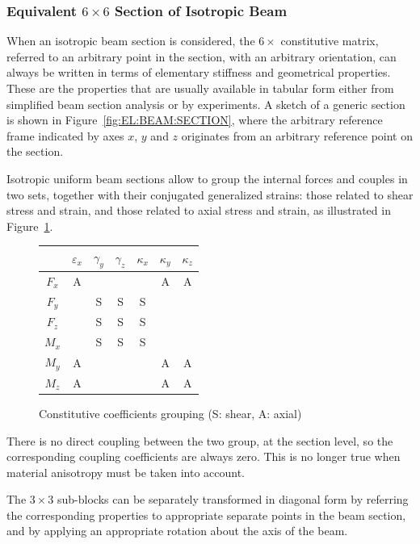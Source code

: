 \subsubsection{Equivalent $6\times6$ Section of Isotropic Beam}
When an isotropic beam section is considered, the $6\times$ 
constitutive matrix, referred to an arbitrary point in the section,
with an arbitrary orientation, can always be written in terms 
of elementary stiffness and geometrical properties.
These are the properties that are usually available in tabular form
either from simplified beam section analysis or by experiments.
A sketch of a generic section is shown
in Figure~\ref{fig:EL:BEAM:SECTION},
where the arbitrary reference frame indicated by axes 
$x$, $y$ and $z$ originates from an arbitrary reference point
on the section.

Isotropic uniform beam sections allow to group the internal forces 
and couples in two sets, together with their conjugated generalized 
strains:
those related to shear stress and strain, and those related 
to axial stress and strain, as illustrated
in Figure~\ref{fig:EL:BEAM:GROUPS}.
\begin{figure}[h]
\centering
\begin{tabular}{c|c|c|c|c|c|c|}
	&
		$\varepsilon_x$ &
		$\gamma_y$ &
		$\gamma_z$ &
		$\kappa_x$ &
		$\kappa_y$ &
		$\kappa_z$ \\
	\hline
	$F_x$ & A &   &   &   & A & A \\
	\hline
	$F_y$ &   & S & S & S &   &   \\
	\hline
	$F_z$ &   & S & S & S &   &   \\
	\hline
	$M_x$ &   & S & S & S &   &   \\
	\hline
	$M_y$ & A &   &   &   & A & A \\
	\hline
	$M_z$ & A &   &   &   & A & A \\
	\hline
\end{tabular}
\caption{Constitutive coefficients grouping (S: shear, A: axial)}
\label{fig:EL:BEAM:GROUPS}
\end{figure}
There is no direct coupling between the two group, at the section level,
so the corresponding coupling coefficients are always zero.
This is no longer true when material anisotropy must be taken 
into account.

The $3\times3$ sub-blocks can be separately transformed 
in diagonal form by referring the corresponding properties
to appropriate separate points in the beam section, 
and by applying an appropriate rotation about the axis of the beam.



